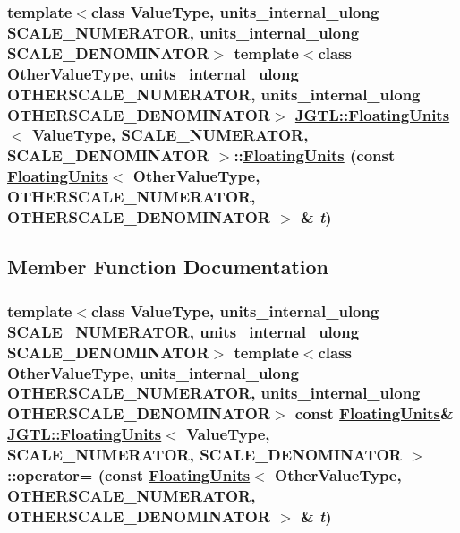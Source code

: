 \hypertarget{class_j_g_t_l_1_1_floating_units_0a786872a5e5665fd87998c4df382753}{
\subsubsection[FloatingUnits]{\setlength{\rightskip}{0pt plus 5cm}template$<$class Value\-Type, units\_\-internal\_\-ulong SCALE\_\-NUMERATOR, units\_\-internal\_\-ulong SCALE\_\-DENOMINATOR$>$ template$<$class Other\-Value\-Type, units\_\-internal\_\-ulong OTHERSCALE\_\-NUMERATOR, units\_\-internal\_\-ulong OTHERSCALE\_\-DENOMINATOR$>$ \hyperlink{class_j_g_t_l_1_1_floating_units}{JGTL::Floating\-Units}$<$ Value\-Type, SCALE\_\-NUMERATOR, SCALE\_\-DENOMINATOR $>$::\hyperlink{class_j_g_t_l_1_1_floating_units}{Floating\-Units} (const \hyperlink{class_j_g_t_l_1_1_floating_units}{Floating\-Units}$<$ Other\-Value\-Type, OTHERSCALE\_\-NUMERATOR, OTHERSCALE\_\-DENOMINATOR $>$ \& {\em t})}}
\label{class_j_g_t_l_1_1_floating_units_0a786872a5e5665fd87998c4df382753}




\subsection{Member Function Documentation}
\hypertarget{class_j_g_t_l_1_1_floating_units_0c909f9f4b76403e848172b65a0c418a}{
\subsubsection[operator=]{\setlength{\rightskip}{0pt plus 5cm}template$<$class Value\-Type, units\_\-internal\_\-ulong SCALE\_\-NUMERATOR, units\_\-internal\_\-ulong SCALE\_\-DENOMINATOR$>$ template$<$class Other\-Value\-Type, units\_\-internal\_\-ulong OTHERSCALE\_\-NUMERATOR, units\_\-internal\_\-ulong OTHERSCALE\_\-DENOMINATOR$>$ const \hyperlink{class_j_g_t_l_1_1_floating_units}{Floating\-Units}\& \hyperlink{class_j_g_t_l_1_1_floating_units}{JGTL::Floating\-Units}$<$ Value\-Type, SCALE\_\-NUMERATOR, SCALE\_\-DENOMINATOR $>$::operator= (const \hyperlink{class_j_g_t_l_1_1_floating_units}{Floating\-Units}$<$ Other\-Value\-Type, OTHERSCALE\_\-NUMERATOR, OTHERSCALE\_\-DENOMINATOR $>$ \& {\em t})}}
\label{class_j_g_t_l_1_1_floating_units_0c909f9f4b76403e848172b65a0c418a}


